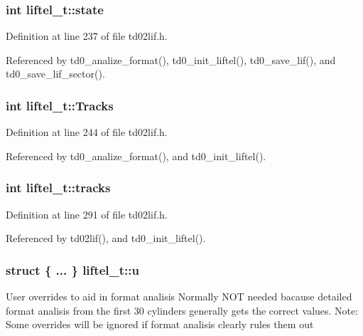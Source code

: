\subsubsection[{\texorpdfstring{state}{state}}]{\setlength{\rightskip}{0pt plus 5cm}int liftel\+\_\+t\+::state}\hypertarget{structliftel__t_a579b9a2411fc6cf4bcdd4cac15d48e49}{}\label{structliftel__t_a579b9a2411fc6cf4bcdd4cac15d48e49}


Definition at line 237 of file td02lif.\+h.



Referenced by td0\+\_\+analize\+\_\+format(), td0\+\_\+init\+\_\+liftel(), td0\+\_\+save\+\_\+lif(), and td0\+\_\+save\+\_\+lif\+\_\+sector().

\subsubsection[{\texorpdfstring{Tracks}{Tracks}}]{\setlength{\rightskip}{0pt plus 5cm}int liftel\+\_\+t\+::\+Tracks}\hypertarget{structliftel__t_a1c433cb2546f09c4093f0e98d61212b2}{}\label{structliftel__t_a1c433cb2546f09c4093f0e98d61212b2}


Definition at line 244 of file td02lif.\+h.



Referenced by td0\+\_\+analize\+\_\+format(), and td0\+\_\+init\+\_\+liftel().

\subsubsection[{\texorpdfstring{tracks}{tracks}}]{\setlength{\rightskip}{0pt plus 5cm}int liftel\+\_\+t\+::tracks}\hypertarget{structliftel__t_a24244c0ee111d3f46eedd7578eb1acf7}{}\label{structliftel__t_a24244c0ee111d3f46eedd7578eb1acf7}


Definition at line 291 of file td02lif.\+h.



Referenced by td02lif(), and td0\+\_\+init\+\_\+liftel().

\subsubsection[{\texorpdfstring{u}{u}}]{\setlength{\rightskip}{0pt plus 5cm}struct \{ ... \}   liftel\+\_\+t\+::u}\hypertarget{structliftel__t_a039066f2594254d80396de7e4c1bf106}{}\label{structliftel__t_a039066f2594254d80396de7e4c1bf106}
User overrides to aid in format analisis Normally N\+OT needed bacause detailed format analisis from the first 30 cylinders generally gets the correct values. Note\+: Some overrides will be ignored if format analisis clearly rules them out

